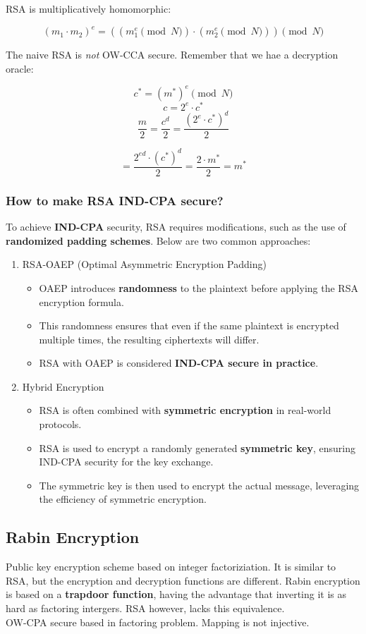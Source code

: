RSA is multiplicatively homomorphic:

\[ (m_1 \cdot m_2)^e = ((m_1^e \pmod{N}) \cdot (m_2^e \pmod{N})) \pmod{N} \]

The naive RSA is \emph{not} OW-CCA secure. Remember that we hae a decryption oracle:

\[ c^* = (m^*)^e \pmod{N} \]
\[ c = 2^e \cdot c^* \]
\[ \frac{m}{2} = \frac{c^d}{2} = \frac{(2^e \cdot c^*)^d}{2} \]

\[ = \frac{2^{ed} \cdot (c^*)^d}{2} = \frac{2 \cdot m^*}{2} = m^*\]


\subsubsection{How to make RSA IND-CPA secure?}

To achieve \textbf{IND-CPA} security, RSA requires modifications, such as the use of \textbf{randomized padding schemes}. Below are two common approaches:

\begin{enumerate}
    \item RSA-OAEP (Optimal Asymmetric Encryption Padding)
\begin{itemize}
    \item OAEP introduces \textbf{randomness} to the plaintext before applying the RSA encryption formula.
    \item This randomness ensures that even if the same plaintext is encrypted multiple times, the resulting ciphertexts will differ.
    \item RSA with OAEP is considered \textbf{IND-CPA secure in practice}.
\end{itemize}

\item Hybrid Encryption
\begin{itemize}
    \item RSA is often combined with \textbf{symmetric encryption} in real-world protocols.
    \item RSA is used to encrypt a randomly generated \textbf{symmetric key}, ensuring IND-CPA security for the key exchange.
    \item The symmetric key is then used to encrypt the actual message, leveraging the efficiency of symmetric encryption.
\end{itemize}
\end{enumerate}

\subsection{Rabin Encryption}
Public key encryption scheme based on integer factoriziation. It is similar to RSA, but the encryption and decryption functions are different. 
Rabin encryption is based on a \textbf{trapdoor function}, having the advantage that inverting it is as hard as factoring intergers. RSA however, lacks this equivalence. \\
OW-CPA secure based in factoring problem. Mapping is not injective. 

